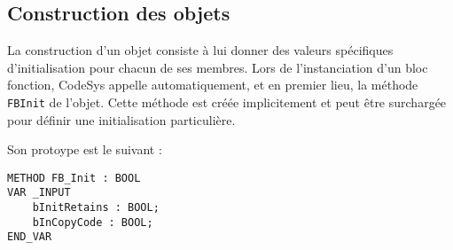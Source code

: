\subsection{Construction des objets}
\label{subsec:construction_objets}
La construction d'un objet consiste à lui donner des valeurs spécifiques d'initialisation pour chacun de ses membres. Lors de l'instanciation d'un bloc fonction, CodeSys appelle automatiquement, et en premier lieu, la méthode \lstinline{FBInit} de l'objet. Cette méthode est créée implicitement et peut être surchargée pour définir une initialisation particulière. 

Son protoype est le suivant : 
\begin{lstlisting}
METHOD FB_Init : BOOL
VAR _INPUT
    bInitRetains : BOOL;
    bInCopyCode : BOOL;
END_VAR
\end{lstlisting}




